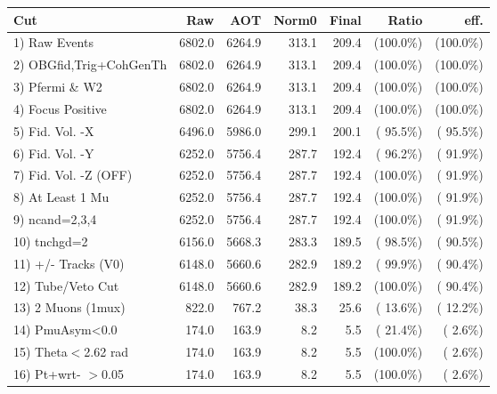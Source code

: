  \begin{table}[h!]\centering
 \begin{tabular}{||l||r|r|r|r|r|r||}
 \hline
 \hline
 Cut & Raw & AOT & Norm0 & Final & Ratio & eff.       \\
 \hline
  1) Raw Events           &       6802.0 &       6264.9 &        313.1 &        209.4 & (100.0\%) & (100.0\%) \\
  2) OBGfid,Trig+CohGenTh &       6802.0 &       6264.9 &        313.1 &        209.4 & (100.0\%) & (100.0\%) \\
  3) Pfermi \& W2         &       6802.0 &       6264.9 &        313.1 &        209.4 & (100.0\%) & (100.0\%) \\
  4) Focus Positive       &       6802.0 &       6264.9 &        313.1 &        209.4 & (100.0\%) & (100.0\%) \\
  5) Fid. Vol. -X         &       6496.0 &       5986.0 &        299.1 &        200.1 & ( 95.5\%) & ( 95.5\%) \\
  6) Fid. Vol. -Y         &       6252.0 &       5756.4 &        287.7 &        192.4 & ( 96.2\%) & ( 91.9\%) \\
  7) Fid. Vol. -Z (OFF)   &       6252.0 &       5756.4 &        287.7 &        192.4 & (100.0\%) & ( 91.9\%) \\
  8) At Least 1 Mu        &       6252.0 &       5756.4 &        287.7 &        192.4 & (100.0\%) & ( 91.9\%) \\
  9) ncand=2,3,4          &       6252.0 &       5756.4 &        287.7 &        192.4 & (100.0\%) & ( 91.9\%) \\
 10) tnchgd=2             &       6156.0 &       5668.3 &        283.3 &        189.5 & ( 98.5\%) & ( 90.5\%) \\
 11) +/- Tracks (V0)      &       6148.0 &       5660.6 &        282.9 &        189.2 & ( 99.9\%) & ( 90.4\%) \\
 12) Tube/Veto Cut        &       6148.0 &       5660.6 &        282.9 &        189.2 & (100.0\%) & ( 90.4\%) \\
 13) 2 Muons (1mux)       &        822.0 &        767.2 &         38.3 &         25.6 & ( 13.6\%) & ( 12.2\%) \\
 14) PmuAsym<0.0          &        174.0 &        163.9 &          8.2 &          5.5 & ( 21.4\%) & (  2.6\%) \\
 15) Theta$<$2.62 rad     &        174.0 &        163.9 &          8.2 &          5.5 & (100.0\%) & (  2.6\%) \\
 16) Pt+wrt- $>$0.05      &        174.0 &        163.9 &          8.2 &          5.5 & (100.0\%) & (  2.6\%) \\

\end{tabular}
\end{table}
